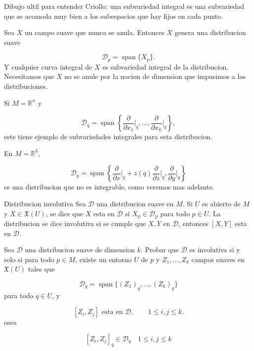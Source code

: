 \begin{bookremark}{Dibujo ultil para entender}
Criollo: una subvariedad integral es una subvariedad que se acomoda muy bien a los subespacios que hay fijos en cada punto. 


\end{bookremark}
\begin{bookexample}{}
Sea $X$ un campo suave que nunca se anula. Entonces $X$ genera una distribucion suave

\[
\mathcal D_p=\operatorname{span}\{X_p\}.
\]
Y cualquier curva integral de $X$ es subvariedad integral de la distribucion. Necesitamos que $X$ no se anule por la nocion de dimension que impusimos a las distribuciones.

\end{bookexample}
\begin{bookexample}{}
Si $M=\mathbb R^n$ y

\[
\mathcal D_q=\operatorname{span}\left\{\frac{\partial}{\partial x_1}\bigg|_q,\ldots,\frac{\partial}{\partial x_k}\bigg|_q\right\},
\]
este tiene ejemplo de subvariedades integrales para esta distribucion.

\end{bookexample}
\begin{bookexample}{}
En $M=\mathbb R^3$,

\[
\mathcal D_q=\operatorname{span}\left\{\frac{\partial}{\partial x}\bigg|_q+z(q)\frac{\partial}{\partial z}\bigg|_q,\frac{\partial}{\partial y}\bigg|_q\right\}
\]
es una distribucion que no es integrable, como veremos mas adelante.

\end{bookexample}
\begin{bookdefinition}{Distribucion involutiva}
Sea $\mathcal D$ una distribucion suave en $M$. Si $U$ es abierto de $M$ y $X\in\mathfrak X(U)$, se dice que $X$ esta en $\mathcal D$ si $X_p\in\mathcal D_p$ para todo $p\in U$. La distribucion se dice involutiva si se cumple que $X,Y$ en $\mathcal D$, entonces $[X,Y]$ esta en $\mathcal D$.

\end{bookdefinition}
\begin{bookexercise}{}
Sea $\mathcal D$ una distribucion suave de dimension $k$. Probar que $\mathcal D$ es involutiva si y solo si para todo $p\in M$, existe un entorno $U$ de $p$ y $Z_1,\ldots,Z_k$ campos suaves en $\mathfrak X(U)$ tales que

\[
\mathcal D_q=\operatorname{span}\{(Z_1)_q,\ldots,(Z_k)_q\}
\]
para todo $q\in U$, y

\[
[Z_i,Z_j]\text{ esta en }\mathcal D,\qquad 1\le i,j\le k.
\]
osea

\[
[Z_{i},Z_{j}]_{q}\in \mathcal{D}_{q}\quad1\leq i,j\leq k
\]
\end{bookexercise}
